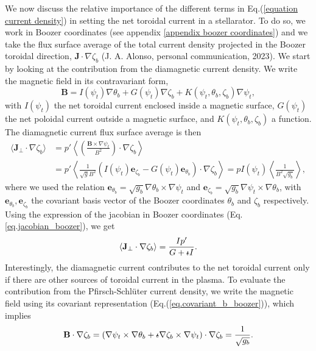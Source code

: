\documentclass[my_thesis.tex]{subfiles}
\begin{document}
We now discuss the relative importance of the different terms in Eq.(\ref{equation current density}) in setting the net toroidal current in a stellarator. To do so, we work in Boozer coordinates (see appendix \ref{appendix  boozer coordinates}) and we take the flux surface average of the total current density projected in the Boozer toroidal direction, $\mathbf{J}\cdot\nabla\zeta_b$ (J. A. Alonso, personal communication, 2023). We start by looking at the contribution from the diamagnetic current density. We write the magnetic field in its contravariant form,
\begin{equation}
	\mathbf{B} = I(\psi_t)\nabla\theta_b + G(\psi_t)\nabla\zeta_b + K(\psi_t,\theta_b,\zeta_b)\nabla\psi_t, 
\end{equation}
with $I(\psi_t)$ the net toroidal current enclosed inside a magnetic surface, $G(\psi_t)$ the net poloidal current outside a magnetic surface, and $K(\psi_t,\theta_b,\zeta_b)$ a function. The diamagnetic current flux surface average is then
\begin{align}
	\langle\mathbf{J}_\perp\cdot\nabla\zeta_b\rangle &= p'\left\langle \left(\frac{\mathbf{B}\times\nabla\psi_t}{B^2}\right)\cdot\nabla\zeta_b\right\rangle\\
	&= p'\left\langle \frac{1}{\sqrt{g}B^2}(I(\psi_t) \mathbf{e}_{\zeta_b} - G(\psi_t)\mathbf{e}_{\theta_b})\cdot\nabla\zeta_b\right\rangle = pI(\psi_t)\left\langle \frac{1}{B^2 \sqrt{g_b}} \right\rangle,
\end{align} 
where we used the relation $\mathbf{e}_{\theta_b} = \sqrt{g_b}\nabla\theta_b\times\nabla\psi_t$ and $\mathbf{e}_{\zeta_b} = \sqrt{g_b}\nabla\psi_t\times\nabla\theta_b$, with $\mathbf{e}_{\theta_b},\mathbf{e}_{\zeta_b}$ the covariant basis vector of the Boozer coordinates $\theta_b$ and $\zeta_b$ respectively. Using the expression of the jacobian in Boozer coordinates (Eq.\ref{eq.jacobian_boozer}), we get
\begin{equation}
	\langle\mathbf{J}_\perp\cdot\nabla\zeta_b\rangle = \frac{Ip'}{G+\text{$\iota\!\!$-} I}.
\end{equation}
Interestingly, the diamagnetic current contributes to the net toroidal current only if there are other sources of toroidal current in the plasma. To evaluate the contribution from the Pfirsch-Schl\"uter current density, we write the magnetic field using its covariant representation (Eq.(\ref{eq.covariant_b_boozer})), which implies
\begin{equation}
	\mathbf{B}\cdot\nabla\zeta_b = (\nabla\psi_t\times\nabla\theta_b + \text{$\iota\!\!$-} \nabla\zeta_b\times\nabla\psi_t)\cdot\nabla\zeta_b = \frac{1}{\sqrt{g_b}}. \label{eq.B_dot_nabla_phi}
\end{equation}
\end{document}

